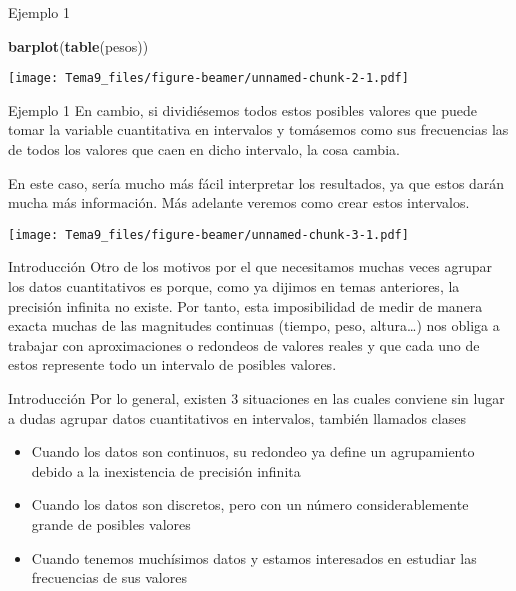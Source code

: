 \documentclass[
  ignorenonframetext,
]{beamer}
\newenvironment{Shaded}{\begin{snugshade}}{\end{snugshade}}
\newcommand{\KeywordTok}[1]{\textcolor[rgb]{0.13,0.29,0.53}{\textbf{#1}}}
\newcommand{\NormalTok}[1]{#1}
\providecommand{\tightlist}{%
  \setlength{\itemsep}{0pt}\setlength{\parskip}{0pt}}
\begin{document}
\begin{frame}[fragile]{Ejemplo 1}
\protect\hypertarget{ejemplo-1-1}{}
\begin{Shaded}
\begin{Highlighting}[]
\KeywordTok{barplot}\NormalTok{(}\KeywordTok{table}\NormalTok{(pesos))}
\end{Highlighting}
\end{Shaded}

\texttt{[image: Tema9\_files/figure-beamer/unnamed-chunk-2-1.pdf]}
\end{frame}

\begin{frame}{Ejemplo 1}
\protect\hypertarget{ejemplo-1-2}{}
En cambio, si dividiésemos todos estos posibles valores que puede tomar
la variable cuantitativa en intervalos y tomásemos como sus frecuencias
las de todos los valores que caen en dicho intervalo, la cosa cambia.

En este caso, sería mucho más fácil interpretar los resultados, ya que
estos darán mucha más información. Más adelante veremos como crear estos
intervalos.

\texttt{[image: Tema9\_files/figure-beamer/unnamed-chunk-3-1.pdf]}
\end{frame}

\begin{frame}{Introducción}
\protect\hypertarget{introducciuxf3n-1}{}
Otro de los motivos por el que necesitamos muchas veces agrupar los
datos cuantitativos es porque, como ya dijimos en temas anteriores, la
precisión infinita no existe. Por tanto, esta imposibilidad de medir de
manera exacta muchas de las magnitudes continuas (tiempo, peso,
altura\ldots) nos obliga a trabajar con aproximaciones o redondeos de
valores reales y que cada uno de estos represente todo un intervalo de
posibles valores.
\end{frame}

\begin{frame}{Introducción}
\protect\hypertarget{introducciuxf3n-2}{}
Por lo general, existen 3 situaciones en las cuales conviene sin lugar a
dudas agrupar datos cuantitativos en intervalos, también llamados clases

\begin{itemize}
\tightlist
\item
  Cuando los datos son continuos, su redondeo ya define un agrupamiento
  debido a la inexistencia de precisión infinita
\item
  Cuando los datos son discretos, pero con un número considerablemente
  grande de posibles valores
\item
  Cuando tenemos muchísimos datos y estamos interesados en estudiar las
  frecuencias de sus valores
\end{itemize}
\end{frame}
\end{document}
